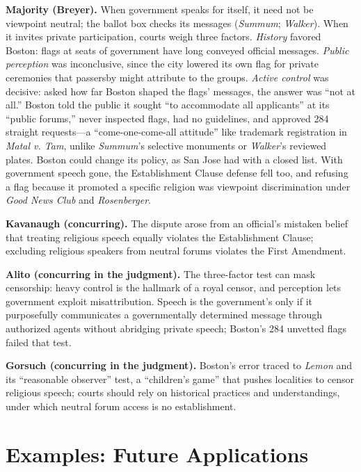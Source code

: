 \documentclass[12pt]{article}
\begin{document}
\textbf{Majority (Breyer).} When government speaks for itself, it need not be viewpoint neutral; the ballot box checks its messages (\textit{Summum}; \textit{Walker}). When it invites private participation, courts weigh three factors. \textit{History} favored Boston: flags at seats of government have long conveyed official messages. \textit{Public perception} was inconclusive, since the city lowered its own flag for private ceremonies that passersby might attribute to the groups. \textit{Active control} was decisive: asked how far Boston shaped the flags' messages, the answer was ``not at all.'' Boston told the public it sought ``to accommodate all applicants'' at its ``public forums,'' never inspected flags, had no guidelines, and approved 284 straight requests---a ``come-one-come-all attitude'' like trademark registration in \textit{Matal v. Tam}, unlike \textit{Summum}'s selective monuments or \textit{Walker}'s reviewed plates. Boston could change its policy, as San Jose had with a closed list. With government speech gone, the Establishment Clause defense fell too, and refusing a flag because it promoted a specific religion was viewpoint discrimination under \textit{Good News Club} and \textit{Rosenberger}.

\textbf{Kavanaugh (concurring).} The dispute arose from an official's mistaken belief that treating religious speech equally violates the Establishment Clause; excluding religious speakers from neutral forums violates the First Amendment.

\textbf{Alito (concurring in the judgment).} The three-factor test can mask censorship: heavy control is the hallmark of a royal censor, and perception lets government exploit misattribution. Speech is the government's only if it purposefully communicates a governmentally determined message through authorized agents without abridging private speech; Boston's 284 unvetted flags failed that test.

\textbf{Gorsuch (concurring in the judgment).} Boston's error traced to \textit{Lemon} and its ``reasonable observer'' test, a ``children's game'' that pushes localities to censor religious speech; courts should rely on historical practices and understandings, under which neutral forum access is no establishment.

\section{Examples: Future Applications}
\end{document}
